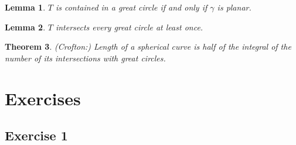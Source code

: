 \documentclass[a4paper,11pt,notitlepage,fullpage]{paper}
\theoremstyle{plain}
\newtheorem{thm}{Theorem}[section] %
\newtheorem{lem}[thm]{Lemma}
\theoremstyle{definition}
\begin{document}
\begin{lem}
$T$ is contained in a great circle if and only if $\gamma$ is planar.
\end{lem}

\begin{lem}
$T$ intersects every great circle at least once.
\end{lem}

\begin{thm}
(Crofton:) Length of a spherical curve is half of the integral of the number of its intersections with great circles.
\end{thm}





\section{Exercises}

\subsection{Exercise 1}
\end{document}
